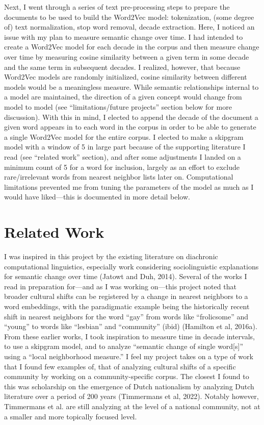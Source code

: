 \documentclass[11pt]{article}
\begin{document}
Next, I went through a series of text pre-processing steps to prepare the documents to be used to build the Word2Vec model: tokenization, (some degree of) text normalization, stop word removal, decade extraction. Here, I noticed an issue with my plan to measure semantic change over time. I had intended to create a Word2Vec model for each decade in the corpus and then measure change over time by measuring cosine similarity between a given term in some decade and the same term in subsequent decades. I realized, however, that because Word2Vec models are randomly initialized, cosine similarity between different models would be a meaningless measure. While semantic relationships internal to a model are maintained, the direction of a given concept would change from model to model (see “limitations/future projects” section below for more discussion). With this in mind, I elected to append the decade of the document a given word appears in to each word in the corpus in order to be able to generate a single Word2Vec model for the entire corpus. I elected to make a skipgram model with a window of 5 in large part because of the supporting literature I read (see “related work” section), and after some adjustments I landed on a minimum count of 5 for a word for inclusion, largely as an effort to exclude rare/irrelevant words from nearest neighbor lists later on. Computational limitations prevented me from tuning the parameters of the model as much as I would have liked—this is documented in more detail below.



\section{Related Work}

I was inspired in this project by the existing literature on diachronic computational linguistics, especially work considering sociolinguistic explanations for semantic change over time (Jatowt and Duh, 2014). Several of the works I read in preparation for—and as I was working on—this project noted that broader cultural shifts can be registered by a change in nearest neighbors to a word embeddings, with the paradigmatic example being the historically recent shift in nearest neighbors for the word “gay” from words like “frolicsome” and “young” to words like “lesbian” and “community” (ibid) (Hamilton et al, 2016a). From these earlier works, I took inspiration to measure time in decade intervals, to use a skipgram model, and to analyze “semantic change of single word[s]” using a “local neighborhood measure.” I feel my project takes on a type of work that I found few examples of, that of analyzing cultural shifts of a specific community by working on a community-specific corpus. The closest I found to this was scholarship on the emergence of Dutch nationalism by analyzing Dutch literature over a period of 200 years (Timmermans et al, 2022). Notably however, Timmermans et al. are still analyzing at the level of a national community, not at a smaller and more topically focused level.
\end{document}
